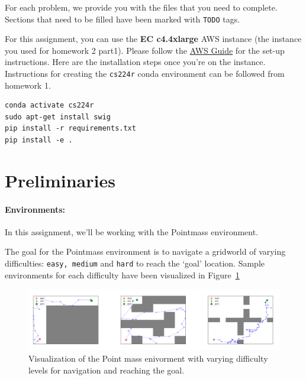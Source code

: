 \documentclass[12pt]{article}
\begin{document}
For each problem, we provide you with the files that you need to complete. Sections that need to be filled have been marked with \texttt{TODO} tags.


For this assignment, you can use the \textbf{EC c4.4xlarge} AWS instance (the instance you used for homework 2 part1). Please follow the \href{https://docs.google.com/document/d/1MpTh0BejM8Z9cQq5iCd3xUIm3mxM7viiZQIdtqkxKXw/edit?usp=sharing}{AWS Guide} for the set-up instructions. Here are the installation steps once you're on the instance. Instructions for creating the \texttt{cs224r} conda environment can be followed from homework 1.

\begin{tcolorbox}[width=\linewidth, sharp corners=all, colback=white!95!black]
\begin{verbatim}
conda activate cs224r
sudo apt-get install swig
pip install -r requirements.txt
pip install -e .
\end{verbatim}
\end{tcolorbox}



\newpage
\section*{Preliminaries}

\paragraph{Environments: } In this assignment, we'll be working with the Pointmass environment. 

The goal for the Pointmass environment is to navigate a gridworld of varying difficulties: \texttt{easy, medium} and \texttt{hard} to reach the `goal' location. Sample environments for each difficulty have been visualized in Figure~\ref{fig:pointmass_vis}

\begin{figure}[htbp]
    \centering
    \includegraphics[scale=0.38]{figures/point_mass_envs.png}
    \caption{Visualization of the Point mass enivorment with varying difficulty levels for navigation and reaching the goal.}
    \label{fig:pointmass_vis}
\end{figure}
\end{document}
